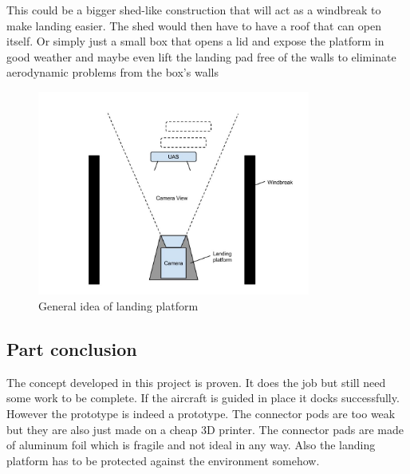 This could be a bigger shed-like construction that will act as a windbreak to make landing easier. The shed would then have to have a roof that can open itself. Or simply just a small box that opens a lid and expose the platform in good weather and maybe even lift the landing pad free of the walls to eliminate aerodynamic problems from the box's walls

\begin{figure}
	\centering
	\includegraphics[width=0.8\textwidth]{imgs/landing_platform}
	\caption{General idea of landing platform}
\end{figure}

\subsection{Part conclusion}
The concept developed in this project is proven. It does the job but still need some work to be complete. If the aircraft is guided in place it docks successfully. However the prototype is indeed a prototype. The connector pods are too weak but they are also just made on a cheap 3D printer. The connector pads are made of aluminum foil which is fragile and not ideal in any way. Also the landing platform has to be protected against the environment somehow. 